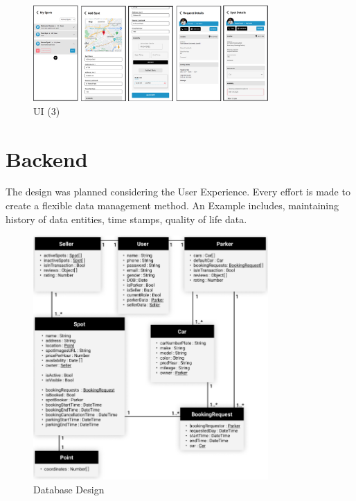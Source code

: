                     
                    \begin{figure}[h]
                        \centering
                        \includegraphics[width=0.8\textwidth]{images/ui3.png}
                        \caption{UI (3)}
                        \label{fig:ui3}
                    \end{figure}

                \pagebreak
                \clearpage
                    
                \section{Backend}
                    The design was planned considering the User Experience. Every effort is made to create a flexible data management method. An Example includes, maintaining history of data entities, time stamps, quality of life data.
                   \begin{figure}[h]
                        \centering
                        \includegraphics[width=0.8\textwidth]{images/dbDesign.png}
                        \caption{Database Design}
                        \label{fig:dbDesign}
                   \end{figure}

